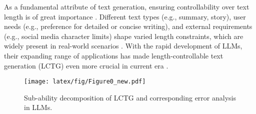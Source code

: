 As a fundamental attribute of text generation, ensuring controllability over text length is of great importance \citep{CTGsurvey}. 
Different text types (e.g., summary, story), user needs (e.g., preference for detailed or concise writing), and external requirements (e.g., social media character limits) shape varied length constraints, which are widely present in real-world scenarios \citep{zhang2023survey}.
With the rapid development of LLMs, their expanding range of applications has made length-controllable text generation (LCTG) even more crucial in current era \citep{foster2024token,gu2024length}.


\begin{figure*}[t]
  \texttt{[image: latex/fig/Figure0\_new.pdf]}
  \caption{Sub-ability decomposition of LCTG and corresponding error analysis in LLMs.}
  \vspace{-0.5cm} %
  \label{fig:Figure0}
\end{figure*}





